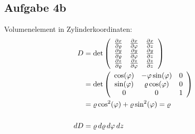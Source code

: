 \documentclass[a4paper,10pt]{extarticle}
\begin{document}
  \subsection*{Aufgabe 4b}
  Volumenelement in Zylinderkoordinaten:
  \begin{align*}
  D &= \det \left(\begin{array}{c c c}
    \pdv{x}{\varrho} & \pdv{x}{\varphi} & \pdv{x}{z} \\
    \pdv{y}{\varrho} & \pdv{y}{\varphi} & \pdv{y}{z} \\
    \pdv{z}{\varrho} & \pdv{z}{\varphi} & \pdv{z}{z} \\
  \end{array}\right) \\
  &= \det \left(\begin{array}{c c c}
    \cos(\varphi) & -\varphi \sin(\varphi) & 0 \\
    \sin(\varphi) & \varrho \cos(\varphi) & 0 \\
    0 & 0 & 1 \\
  \end{array}\right) \\
  &= \varrho \cos^2(\varphi) + \varrho \sin^2(\varphi) = \varrho \\ \\
  dD &= \varrho \,d\varrho \, d\varphi \, dz
  \end{align*}
\end{document}

